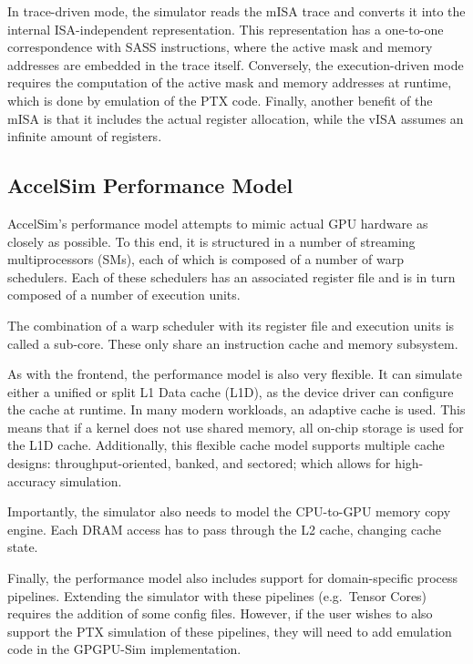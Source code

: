 In trace-driven mode, the simulator reads the mISA trace and converts it into the internal ISA-independent representation.
This representation has a one-to-one correspondence with SASS instructions, where the active mask and memory addresses are embedded in the trace itself.
Conversely, the execution-driven mode requires the computation of the active mask and memory addresses at runtime, which is done by emulation of the PTX code.
Finally, another benefit of the mISA is that it includes the actual register allocation, while the vISA assumes an infinite amount of registers.

\subsection{AccelSim Performance Model}\label{subsec:accelsim-performance-model}
AccelSim's performance model attempts to mimic actual GPU hardware as closely as possible.
To this end, it is structured in a number of streaming multiprocessors (SMs), each of which is composed of a number of warp schedulers.
Each of these schedulers has an associated register file and is in turn composed of a number of execution units.

The combination of a warp scheduler with its register file and execution units is called a sub-core.
These only share an instruction cache and memory subsystem.

\vspace{5mm}

As with the frontend, the performance model is also very flexible.
It can simulate either a unified or split L1 Data cache (L1D), as the device driver can configure the cache at runtime.
In many modern workloads, an adaptive cache is used.
This means that if a kernel does not use shared memory, all on-chip storage is used for the L1D cache.
Additionally, this flexible cache model supports multiple cache designs: throughput-oriented, banked, and sectored; which allows for high-accuracy simulation.

Importantly, the simulator also needs to model the CPU-to-GPU memory copy engine.
Each DRAM access has to pass through the L2 cache, changing cache state.

Finally, the performance model also includes support for domain-specific process pipelines.
Extending the simulator with these pipelines (e.g.\ Tensor Cores) requires the addition of some config files.
However, if the user wishes to also support the PTX simulation of these pipelines, they will need to add emulation code in the GPGPU-Sim implementation.

